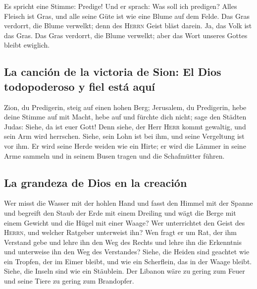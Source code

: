  Es spricht eine Stimme: Predige! Und er sprach: Was soll
ich predigen? Alles Fleisch ist Gras, und alle seine Güte ist wie eine
Blume auf dem Felde.  Das Gras verdorrt, die Blume
verwelkt; denn des \textsc{Herrn} Geist bläst darein. Ja, das Volk ist
das Gras.  Das Gras verdorrt, die Blume verwelkt; aber das
Wort unseres Gottes bleibt ewiglich.

\hypertarget{la-canciuxf3n-de-la-victoria-de-sion-el-dios-todopoderoso-y-fiel-estuxe1-aquuxed}{%
\subsection{La canción de la victoria de Sion: El Dios todopoderoso y
fiel está
aquí}\label{la-canciuxf3n-de-la-victoria-de-sion-el-dios-todopoderoso-y-fiel-estuxe1-aquuxed}}

 Zion, du Predigerin, steig auf einen hohen Berg;
Jerusalem, du Predigerin, hebe deine Stimme auf mit Macht, hebe auf und
fürchte dich nicht; sage den Städten Judas: Siehe, da ist euer Gott!
 Denn siehe, der Herr \textsc{Herr} kommt gewaltig, und
sein Arm wird herrschen. Siehe, sein Lohn ist bei ihm, und seine
Vergeltung ist vor ihm.  Er wird seine Herde weiden wie
ein Hirte; er wird die Lämmer in seine Arme sammeln und in seinem Busen
tragen und die Schafmütter führen.

\hypertarget{la-grandeza-de-dios-en-la-creaciuxf3n}{%
\subsection{La grandeza de Dios en la
creación}\label{la-grandeza-de-dios-en-la-creaciuxf3n}}

 Wer misst die Wasser mit der hohlen Hand und fasst den
Himmel mit der Spanne und begreift den Staub der Erde mit einem Dreiling
und wägt die Berge mit einem Gewicht und die Hügel mit einer Waage?
 Wer unterrichtet den Geist des \textsc{Herrn}, und
welcher Ratgeber unterweist ihn?  Wen fragt er um Rat,
der ihm Verstand gebe und lehre ihn den Weg des Rechts und lehre ihn die
Erkenntnis und unterweise ihn den Weg des Verstandes? 
Siehe, die Heiden sind geachtet wie ein Tropfen, der im Eimer bleibt,
und wie ein Scherflein, das in der Waage bleibt. Siehe, die Inseln sind
wie ein Stäublein.  Der Libanon wäre zu gering zum Feuer
und seine Tiere zu gering zum Brandopfer.

